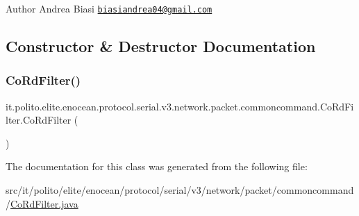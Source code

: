 \begin{DoxyAuthor}{Author}
Andrea Biasi \href{mailto:biasiandrea04@gmail.com}{\tt biasiandrea04@gmail.\+com} 
\end{DoxyAuthor}


\subsection{Constructor \& Destructor Documentation}
\hypertarget{classit_1_1polito_1_1elite_1_1enocean_1_1protocol_1_1serial_1_1v3_1_1network_1_1packet_1_1commoncommand_1_1_co_rd_filter_ae7f75633487b852cd17112e5e8158cc6}{}\label{classit_1_1polito_1_1elite_1_1enocean_1_1protocol_1_1serial_1_1v3_1_1network_1_1packet_1_1commoncommand_1_1_co_rd_filter_ae7f75633487b852cd17112e5e8158cc6} 
\subsubsection{\texorpdfstring{Co\+Rd\+Filter()}{CoRdFilter()}}
{\footnotesize\ttfamily it.\+polito.\+elite.\+enocean.\+protocol.\+serial.\+v3.\+network.\+packet.\+commoncommand.\+Co\+Rd\+Filter.\+Co\+Rd\+Filter (\begin{DoxyParamCaption}{ }\end{DoxyParamCaption})}



The documentation for this class was generated from the following file\+:\begin{DoxyCompactItemize}
\item 
src/it/polito/elite/enocean/protocol/serial/v3/network/packet/commoncommand/\hyperlink{_co_rd_filter_8java}{Co\+Rd\+Filter.\+java}\end{DoxyCompactItemize}
